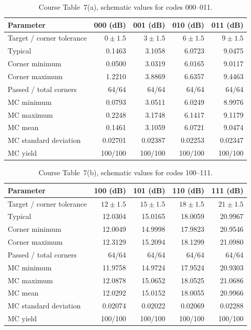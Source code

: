 \begin{table}[H]
\centering
\caption{Course Table~7(a), schematic values for codes 000--011.}
\label{tab:pga-table7-low}
\scriptsize
\renewcommand{\arraystretch}{0.92}
\begin{tabularx}{\textwidth}{@{}Yrrrr@{}}
\toprule
Parameter & 000 (dB) & 001 (dB) & 010 (dB) & 011 (dB) \\
\midrule
Target / corner tolerance & $0\pm1.5$ & $3\pm1.5$ & $6\pm1.5$ & $9\pm1.5$ \\
Typical & 0.1463 & 3.1058 & 6.0723 & 9.0475 \\
Corner minimum & 0.0500 & 3.0319 & 6.0165 & 9.0117 \\
Corner maximum & 1.2210 & 3.8869 & 6.6357 & 9.4463 \\
Passed / total corners & 64/64 & 64/64 & 64/64 & 64/64 \\
\midrule
MC minimum & 0.0793 & 3.0511 & 6.0249 & 8.9976 \\
MC maximum & 0.2248 & 3.1748 & 6.1417 & 9.1179 \\
MC mean & 0.1461 & 3.1059 & 6.0721 & 9.0474 \\
MC standard deviation & 0.02701 & 0.02387 & 0.02253 & 0.02347 \\
MC yield & 100/100 & 100/100 & 100/100 & 100/100 \\
\bottomrule
\end{tabularx}
\end{table}

\begin{table}[H]
\centering
\caption{Course Table~7(b), schematic values for codes 100--111.}
\label{tab:pga-table7-high}
\scriptsize
\renewcommand{\arraystretch}{0.92}
\begin{tabularx}{\textwidth}{@{}Yrrrr@{}}
\toprule
Parameter & 100 (dB) & 101 (dB) & 110 (dB) & 111 (dB) \\
\midrule
Target / corner tolerance & $12\pm1.5$ & $15\pm1.5$ & $18\pm1.5$ & $21\pm1.5$ \\
Typical & 12.0304 & 15.0165 & 18.0059 & 20.9967 \\
Corner minimum & 12.0049 & 14.9998 & 17.9823 & 20.9546 \\
Corner maximum & 12.3129 & 15.2094 & 18.1299 & 21.0980 \\
Passed / total corners & 64/64 & 64/64 & 64/64 & 64/64 \\
\midrule
MC minimum & 11.9758 & 14.9724 & 17.9524 & 20.9303 \\
MC maximum & 12.0878 & 15.0652 & 18.0525 & 21.0686 \\
MC mean & 12.0292 & 15.0152 & 18.0055 & 20.9966 \\
MC standard deviation & 0.02074 & 0.02022 & 0.02069 & 0.02288 \\
MC yield & 100/100 & 100/100 & 100/100 & 100/100 \\
\bottomrule
\end{tabularx}
\end{table}

